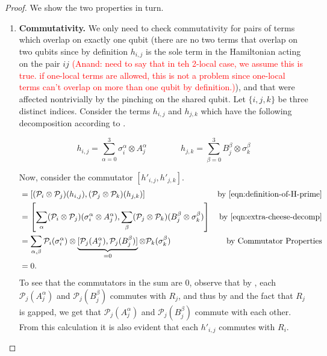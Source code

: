 \documentclass[11pt]{article}
\theoremstyle{plain}
\newcommand{\AnandNote}[1]{\textcolor{red}{(Anand: #1)}}
\newcommand{\AnandNote}[1]{}
\renewcommand{\cP}{\mathcal{P}}
\begin{document}
\begin{proof}

We show the two properties in turn.
\begin{enumerate}
    \item \textbf{Commutativity.} We only need to check commutativity for pairs of terms which overlap on exactly one qubit (there are no two terms that overlap on two qubits since by definition $h_{i,j}$ is the sole term in the Hamiltonian acting on the pair $ij$ \AnandNote{need to say that in teh 2-local case, we assume this is true. if one-local terms are allowed, this is not a problem since one-local terms can't overlap on more than one qubit by definition.}), and that were affected nontrivially by the pinching on the shared qubit. Let $\{i, j, k\}$ be three distinct indices. Consider the terms $h_{i,j}$ and $h_{j,k}$ which have the following decomposition according to .

    \begin{equation}\label{eqn:extra-cheese-decomp}
        h_{i,j} = \sum\limits_{\alpha = 0}^3 \sigma^\alpha_i \otimes A_j^\alpha \quad\quad\quad\quad h_{j,k} = \sum\limits_{\beta = 0}^3 B_j^\beta \otimes \sigma^\beta_k
    \end{equation}
    
Now, consider the commutator $[h'_{i,j}, h'_{j,k}]$.
\begin{align*}
    [h'_{i,j}, h'_{j,k}] &= [ (\cP_i \otimes \cP_j)(h_{i,j}), (\cP_j \otimes \cP_k)(h_{j,k}) ] & \text{by \Cref{eqn:definition-of-H-prime}}\\
    &= \left[ \sum_{\alpha} (\cP_i \otimes \cP_j)(\sigma^\alpha_i \otimes A_j^\alpha), \sum_{\beta} (\cP_j \otimes \cP_k)(B_j^\beta \otimes \sigma^\beta_k) \right ] & \text{by \Cref{eqn:extra-cheese-decomp}}\\
    &= \sum_{\alpha,\beta} \cP_i(\sigma_i^\alpha) \otimes \underbrace{[\cP_j(A^\alpha_j), \cP_j(B^\beta_j)]}_{=0} \otimes \cP_k(\sigma_k^\beta) & \text{by Commutator Properties}\\
    &= 0.
\end{align*}
To see that the commutators in the sum are $0$, observe that by , each $\cP_j(A_j^\alpha)$ and $\cP_j(B_j^\beta)$ commutes with $R_j$, and thus by  and the fact that $R_j$ is gapped, we get that $\cP_j(A_j^\alpha)$ and $\cP_j(B_j^\beta)$ commute with each other. From this calculation it is also evident that each $h'_{i,j}$ commutes with $R_i$. 


\end{enumerate}
\end{proof}
\end{document}
